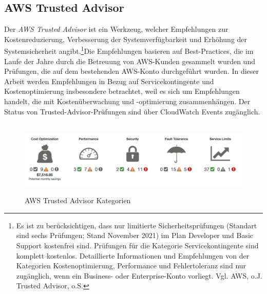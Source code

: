 \subsection{AWS Trusted Advisor}
Der \textit{AWS Trusted Advisor} ist ein Werkzeug, welcher Empfehlungen zur Kostenreduzierung, Verbesserung der Systemverfügbarkeit und Erhöhung der Systemsicherheit angibt.\footnote{Es ist zu berücksichtigen, dass nur limitierte Sicherheitsprüfungen (Standart sind sechs Prüfungen; Stand November 2021) im Plan Developer und Basic Support kostenfrei sind. Prüfungen für die Kategorie Servicekontingente sind komplett kostenlos. Detaillierte Informationen und Empfehlungen von der Kategorien Kostenoptimierung, Performance und Fehlertoleranz sind nur zugänglich, wenn ein Business- oder Enterprise-Konto vorliegt. Vgl. AWS, o.J. Trusted Advisor, o.S.\cite{AMZ20}}Die Empfehlungen basieren auf Best-Practices, die im Laufe der Jahre durch die Betreuung von AWS-Kunden gesammelt wurden und Prüfungen, die auf dem bestehenden AWS-Konto durchgeführt wurden.
In dieser Arbeit werden Empfehlungen in Bezug auf Servicekontingente und Kostenoptimierung insbesondere betrachtet, weil es sich um Empfehlungen handelt, die mit Kostenüberwachung und -optimierung zusammenhängen. Der Status von Trusted-Advisor-Prüfungen sind über CloudWatch Events zugänglich. 
\\\\
\begin{figure}[h!]
      \centering
      \includegraphics[scale=0.4]{sources/AWS_Trusted_Advisor_Kategorien}
      \caption[AWS Trusted Advisor Kategorien]{}
      \label{fig:AWS_Trusted_Advisor_Kategorien} 
      AWS Trusted Advisor Kategorien\cite{AMZ20}
\end{figure}
